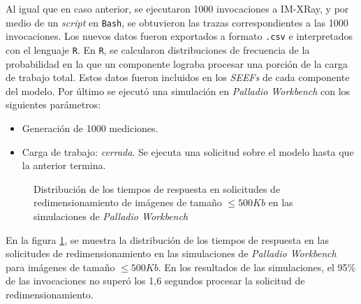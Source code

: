 Al igual que en caso anterior, se ejecutaron 1000 invocaciones a IM-XRay, y por medio de un \emph{script} en \texttt{Bash}, se obtuvieron las trazas correspondientes a las 1000 invocaciones. Los nuevos datos fueron exportados a formato \texttt{.csv} e interpretados con el lenguaje \texttt{R}. En \texttt{R}, se calcularon distribuciones de frecuencia de la probabilidad en la que un componente lograba procesar una porción de la carga de trabajo total. Estos datos fueron incluidos en los \emph{SEEFs} de cada componente del modelo. Por último se ejecutó una simulación en \emph{Palladio Workbench} con los siguientes parámetros:
\begin{itemize}
    \item Generación de 1000 mediciones.
    \item Carga de trabajo: \emph{cerrada}. Se ejecuta una solicitud sobre el modelo hasta que la anterior termina. 
\end{itemize}

\begin{figure}[h]
\hspace{-2.0cm}
\caption{Distribución de los tiempos de respuesta en solicitudes de redimensionamiento de imágenes de tamaño $\leq 500Kb$ en las simulaciones de \emph{Palladio Workbench}}
\label{fig:distribucion-simulacion-imagenes-hasta-500kb}
\end{figure}

En la figura \ref{fig:distribucion-simulacion-imagenes-hasta-500kb}, se muestra la distribución de los tiempos de respuesta en las solicitudes de redimensionamiento en las simulaciones de \emph{Palladio Workbench} para imágenes de tamaño $\leq 500Kb$. En los resultados de las simulaciones, el 95\% de las invocaciones no superó los 1,6 segundos procesar la solicitud de redimensionamiento.

